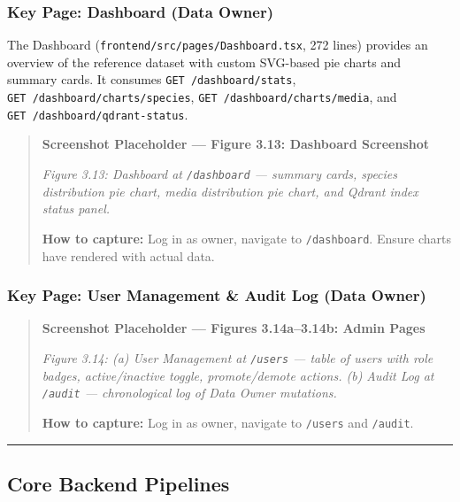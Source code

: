 \subsubsection{Key Page: Dashboard (Data Owner)}\label{key-page-dashboard-data-owner}

The Dashboard (\texttt{frontend/src/pages/Dashboard.tsx}, 272 lines) provides an overview of the reference dataset with custom SVG-based pie charts and summary cards. It consumes \texttt{GET\ /dashboard/stats}, \texttt{GET\ /dashboard/charts/species}, \texttt{GET\ /dashboard/charts/media}, and \texttt{GET\ /dashboard/qdrant-status}.

\begin{quote}
\textbf{Screenshot Placeholder --- Figure 3.13: Dashboard Screenshot}

\emph{Figure 3.13: Dashboard at \texttt{/dashboard} --- summary cards, species distribution pie chart, media distribution pie chart, and Qdrant index status panel.}

\textbf{How to capture:} Log in as owner, navigate to \texttt{/dashboard}. Ensure charts have rendered with actual data.
\end{quote}

\subsubsection{Key Page: User Management \& Audit Log (Data Owner)}\label{key-page-user-management-audit-log-data-owner}

\begin{quote}
\textbf{Screenshot Placeholder --- Figures 3.14a--3.14b: Admin Pages}

\emph{Figure 3.14: (a) User Management at \texttt{/users} --- table of users with role badges, active/inactive toggle, promote/demote actions. (b) Audit Log at \texttt{/audit} --- chronological log of Data Owner mutations.}

\textbf{How to capture:} Log in as owner, navigate to \texttt{/users} and \texttt{/audit}.
\end{quote}

\begin{center}\rule{0.5\linewidth}{0.5pt}\end{center}

\subsection{Core Backend Pipelines}\label{core-backend-pipelines}

